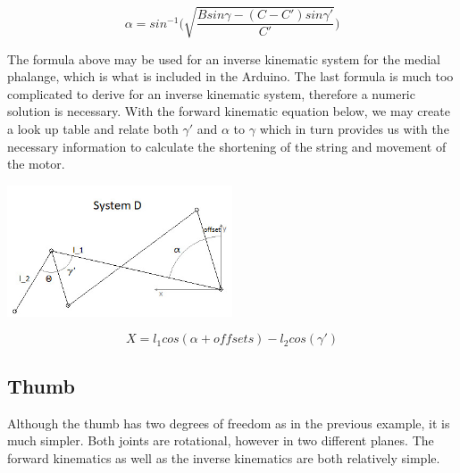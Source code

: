 \documentclass{article}
\begin{document}
\[ \alpha = sin^{-1} \bigg( \sqrt{\frac{Bsin\gamma-(C-C')sin\gamma'}{C'}} \bigg) \]

The formula above may be used for an inverse kinematic system for the medial phalange, which is what is included in the Arduino. The last formula is much too complicated to derive for an inverse kinematic system, therefore a numeric solution is necessary. With the forward kinematic equation below, we may create a look up table and relate both $\gamma'$ and $\alpha$ to $\gamma$ which in turn provides us with the necessary information to calculate the shortening of the string and movement of the motor.

\begin{center}
\includegraphics[width=0.5\textwidth]{IMG/IK_05.jpeg}
\end{center}


\[ X = l_1 cos(\alpha+offsets) - l_2 cos(\gamma') \]


\subsection{Thumb}
Although the thumb has two degrees of freedom as in the previous example, it is much simpler. Both joints are rotational, however in two different planes. The forward kinematics as well as the inverse kinematics are both relatively simple.
\end{document}

